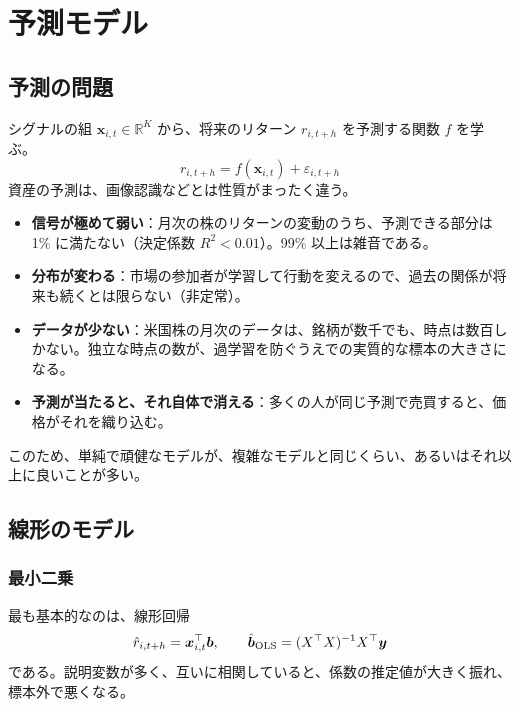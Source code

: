 \chapter{予測モデル}
\label{ch:model}

\section{予測の問題}

シグナルの組 $\bm{x}_{i,t} \in \mathbb{R}^K$ から、将来のリターン $r_{i,t+h}$ を予測する関数 $f$ を学ぶ。
\begin{equation}
r_{i,t+h} = f(\bm{x}_{i,t}) + \varepsilon_{i,t+h}
\end{equation}
資産の予測は、画像認識などとは性質がまったく違う。

\begin{itemize}
\item \textbf{信号が極めて弱い}：月次の株のリターンの変動のうち、予測できる部分は 1\% に満たない（決定係数 $R^2 < 0.01$）。99\% 以上は雑音である。
\item \textbf{分布が変わる}：市場の参加者が学習して行動を変えるので、過去の関係が将来も続くとは限らない（非定常）。
\item \textbf{データが少ない}：米国株の月次のデータは、銘柄が数千でも、時点は数百しかない。独立な時点の数が、過学習を防ぐうえでの実質的な標本の大きさになる。
\item \textbf{予測が当たると、それ自体で消える}：多くの人が同じ予測で売買すると、価格がそれを織り込む。
\end{itemize}

このため、単純で頑健なモデルが、複雑なモデルと同じくらい、あるいはそれ以上に良いことが多い。

\section{線形のモデル}

\subsection{最小二乗}

最も基本的なのは、線形回帰
\begin{equation}
\hat{r}_{i,t+h} = \bm{x}_{i,t}^{\top} \bm{b}, \qquad \hat{\bm{b}}_{\mathrm{OLS}} = (X^{\top} X)^{-1} X^{\top} \bm{y}
\end{equation}
である。説明変数が多く、互いに相関していると、係数の推定値が大きく振れ、標本外で悪くなる。

